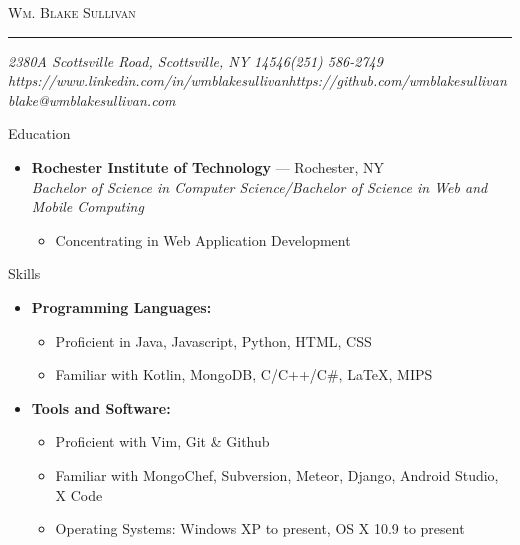 \documentclass[10pt,oneside]{article}
\makeatletter
\newcommand{\name}{Wm. Blake Sullivan}
\newcommand{\addr}{2380A Scottsville Road, Scottsville, NY 14546}
\newcommand{\phone}{(251) 586-2749}
\newcommand{\email}{blake@wmblakesullivan.com}
\newcommand{\github}{https://github.com/wmblakesullivan}
\newcommand{\linkedin}{https://www.linkedin.com/in/wmblakesullivan}
\newcommand{\bigname}[1]{
	\begin{center}\fontfamily{bch}\selectfont\Huge\scshape#1\end{center}
}
\newenvironment{ressection}[1]{
	\vspace{3pt}
	{\fontfamily{bch}\selectfont\Large#1}
	\begin{itemize}
	\vspace{2pt}
}{
	\end{itemize}
}
\newcommand{\resitem}[1]{
	\vspace{-2pt}
	\item \begin{flushleft} #1 \end{flushleft}
}
\newcommand{\ressubitem}[1]{
	\vspace{-1pt}
	\item \begin{flushleft} #1 \end{flushleft}
}
\newcommand{\resbigitem}[3]{
	\vspace{-3pt}
	\item
	\textbf{#1} --- #2 \\
	\textit{#3}
}
\newenvironment{ressubsec}[3]{
	\resbigitem{#1}{#2}{#3}
	\vspace{-1pt}
	\begin{itemize}
}{
	\end{itemize}
}
\newenvironment{reslist}[1]{
	\resitem{\textbf{#1}}
	\vspace{-3pt}
	\begin{itemize}
}{
	\end{itemize}
}
\makeatother
\begin{document}
 \selectfont

\bigname{\name}

\vspace{-4pt} \rule{\textwidth}{1pt}

\vspace{-1pt} {\normalsize\itshape \addr \hfill \phone \\ \linkedin \hfill \github \\ \email}

\vspace{15 pt}





\begin{ressection}{Education}

	\begin{ressubsec}{Rochester Institute of Technology}{Rochester, NY}{Bachelor of Science in Computer Science/Bachelor of Science in Web and Mobile Computing}
		\ressubitem{Concentrating in Web Application Development}
	\end{ressubsec}

\end{ressection}


\begin{ressection}{Skills}


	\begin{reslist}{Programming Languages:}
		\ressubitem{Proficient in Java, Javascript, Python, HTML, CSS}
		\ressubitem{Familiar with Kotlin, MongoDB, C/C++/C\#, \LaTeX, MIPS}
	\end{reslist}

	\begin{reslist}{Tools and Software:}
		\ressubitem{Proficient with Vim, Git \& Github}
		\ressubitem{Familiar with MongoChef, Subversion, Meteor, Django, Android Studio, X Code}
		\ressubitem{Operating Systems: Windows XP to present, OS X 10.9 to present}
	\end{reslist}

\end{ressection}
\end{document}
